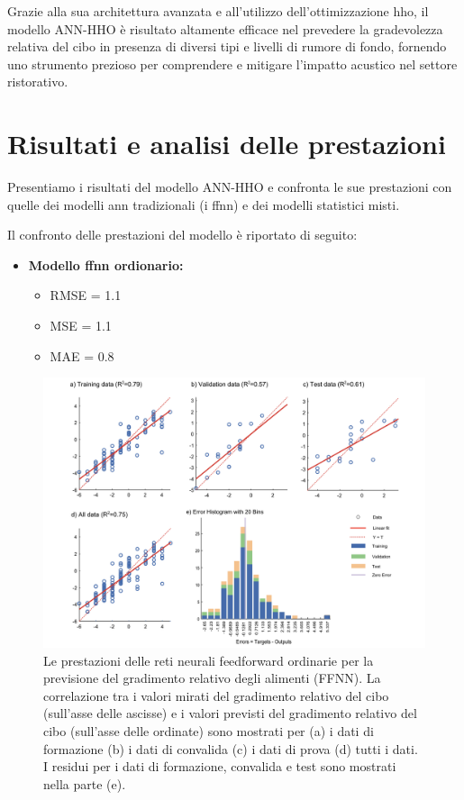 Grazie alla sua architettura avanzata e all'utilizzo dell'ottimizzazione \gls{hho}, il modello ANN-HHO è risultato altamente efficace nel prevedere la gradevolezza relativa del cibo in presenza di diversi tipi e livelli di rumore di fondo, fornendo uno strumento prezioso per comprendere e mitigare l'impatto acustico nel settore ristorativo.

\section{Risultati e analisi delle prestazioni}
\noindent

Presentiamo i risultati del modello ANN-HHO e confronta le sue prestazioni con quelle dei modelli \gls{ann} tradizionali (i \gls{ffnn}) e dei modelli statistici misti.

Il confronto delle prestazioni del modello è riportato di seguito:

\begin{itemize}
      \item \textbf{Modello \gls{ffnn} ordionario:}
            \begin{itemize}
                  \item RMSE = 1.1
                  \item MSE = 1.1
                   \item MAE = 0.8
            \end{itemize}       
\end{itemize}

\begin{figure}[H]
      \captionsetup{font=scriptsize}
      \centering
      \includegraphics[width=1\textwidth]{Chapters/Figures/ffnn-result.png} 
      \caption{\small Le prestazioni delle reti neurali feedforward ordinarie per la previsione del gradimento relativo degli alimenti (FFNN). La correlazione tra i valori mirati del gradimento relativo del cibo (sull'asse delle ascisse) e i valori previsti del gradimento relativo del cibo (sull'asse delle ordinate) sono mostrati per (a) i dati di formazione (b) i dati di convalida (c) i dati di prova (d) tutti i dati. I residui per i dati di formazione, convalida e test sono mostrati nella parte (e). \cite{alamir2021enhanced}}
      \label{fig:ffnn-abc}
\end{figure}

